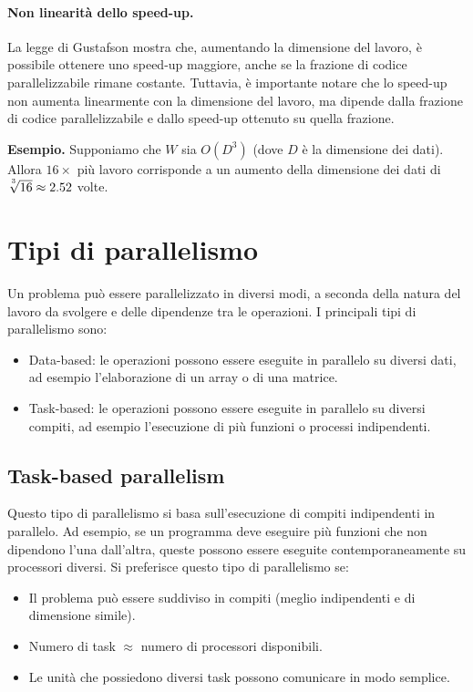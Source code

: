 \paragraph{Non linearità dello speed-up.}
La legge di Gustafson mostra che, aumentando la dimensione del lavoro, è possibile ottenere uno speed-up maggiore, anche se la frazione di codice parallelizzabile rimane costante. Tuttavia, è importante notare che lo speed-up non aumenta linearmente con la dimensione del lavoro, ma dipende dalla frazione di codice parallelizzabile e dallo speed-up ottenuto su quella frazione.

\medskip
\noindent
\textbf{Esempio.}
Supponiamo che $W$ sia $O(D^3)$ (dove $D$ è la dimensione dei dati). Allora $16 \times$ più lavoro corrisponde a un aumento della dimensione dei dati di $\root^3\of{16} \approx 2.52$ volte.

\section{Tipi di parallelismo}
Un problema può essere parallelizzato in diversi modi, a seconda della natura del lavoro da svolgere e delle dipendenze tra le operazioni. I principali tipi di parallelismo sono:
\begin{itemize}
    \item Data-based: le operazioni possono essere eseguite in parallelo su diversi dati, ad esempio l'elaborazione di un array o di una matrice.
    \item Task-based: le operazioni possono essere eseguite in parallelo su diversi compiti, ad esempio l'esecuzione di più funzioni o processi indipendenti.
\end{itemize}

\subsection{Task-based parallelism}
Questo tipo di parallelismo si basa sull'esecuzione di compiti indipendenti in parallelo. Ad esempio, se un programma deve eseguire più funzioni che non dipendono l'una dall'altra, queste possono essere eseguite contemporaneamente su processori diversi. Si preferisce questo tipo di parallelismo se:
\begin{itemize}
    \item Il problema può essere suddiviso in compiti (meglio indipendenti e di dimensione simile).
    \item Numero di task $\approx$ numero di processori disponibili.
    \item Le unità che possiedono diversi task possono comunicare in modo semplice.
\end{itemize}


